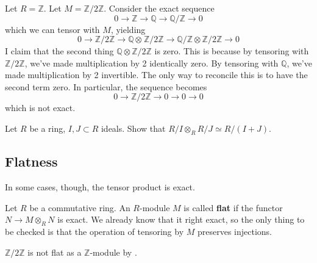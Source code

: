 \begin{example} \label{tensorbad}
Let $R = \mathbb{Z}$. Let $M = \mathbb{Z}/2\mathbb{Z}$. Consider the exact
sequence
\[ 0 \to \mathbb{Z} \to \mathbb{Q} \to \mathbb{Q}/\mathbb{Z} \to 0  \]
which we can tensor with $M$, yielding
\[ 0 \to \mathbb{Z}/2\mathbb{Z} \to \mathbb{Q} \otimes_{}
\mathbb{Z}/2\mathbb{Z} \to  \mathbb{Q}/\mathbb{Z} \otimes
\mathbb{Z}/2\mathbb{Z} \to 0  \]
I claim that the second thing $\mathbb{Q} \otimes \mathbb{Z}/2\mathbb{Z}$
is zero.  This is because by tensoring with
$\mathbb{Z}/2\mathbb{Z}$, we've made multiplication by 2 identically zero. By
tensoring with $\mathbb{Q}$, we've made multiplication by 2 invertible. The
only way to reconcile this is to have the second term zero. In particular, the
sequence becomes
\[ 0 \to \mathbb{Z}/2\mathbb{Z} \to 0 \to 0 \to 0  \]
which is not exact.
\end{example}

\begin{exercise} 
Let $R$ be a ring, $I, J \subset R$ ideals. Show that $R/I \otimes_R R/J
\simeq R/(I+J)$.
\end{exercise} 
\subsection{Flatness}
In some cases, though, the tensor product is exact.

\begin{definition}
Let $R$ be a commutative ring. An $R$-module $M$ is called \textbf{flat} if the
functor $N \to M \otimes_R N$ is exact. We already know that it right exact,
so the only thing to be checked is that the operation of  tensoring by $M$
preserves injections.
\end{definition}

\begin{example}
$\mathbb{Z}/2\mathbb{Z}$ is not flat as a $\mathbb{Z}$-module by
.

\end{example}

